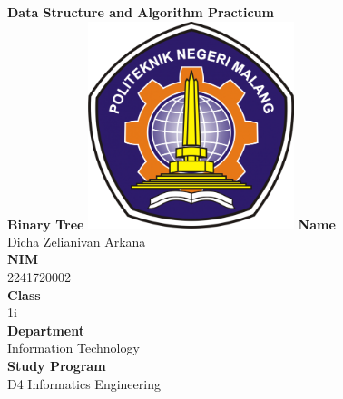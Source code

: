 \documentclass[12pt,titlepage]{article}
\newcommand{\vSubject}{Data Structure and Algorithm Practicum}
\newcommand{\vSubtitle}{Binary Tree}
\newcommand{\vName}{Dicha Zelianivan Arkana}
\newcommand{\vNIM}{2241720002}
\newcommand{\vClass}{1i}
\newcommand{\vDepartment}{Information Technology}
\newcommand{\vStudyProgram}{D4 Informatics Engineering}
\begin{document}
\begin{titlepage}
    \centering
    \vfill
    {\bfseries\LARGE
        \vSubject\\
        \vskip0.25cm
        \vSubtitle
    }
    \vfill
    \includegraphics[width=6cm]{images/polinema-logo.png}
    \vfill
    {
        \textbf{Name}\\
        \vName\\
        \vskip0.5cm
        \textbf{NIM}\\
        \vNIM\\
        \vskip0.5cm
        \textbf{Class}\\
        \vClass\\
        \vskip0.5cm
        \textbf{Department}\\
        \vDepartment\\
        \vskip0.5cm
        \textbf{Study Program}\\
        \vStudyProgram
    }
\end{titlepage}
\end{document}
